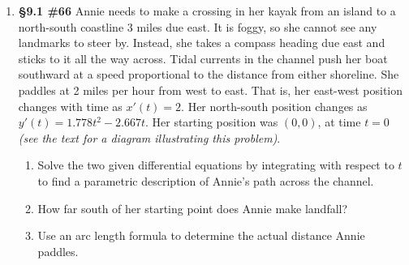 \documentclass[%
]{article}
\begin{document}
\begin{enumerate}
\item {\bf \S9.1 \#66} Annie needs to make a crossing in her kayak from an island to a north-south coastline 3 miles due east.  It is foggy, so she cannot see any landmarks to steer by.  Instead, she takes a compass heading due east and sticks to it all the way across.  Tidal currents in the channel push her boat southward at a speed proportional to the distance from either shoreline.  She paddles at 2 miles per hour from west to east.  That is, her east-west position changes with time as $x'(t)=2$.  Her north-south position changes as $y'(t)=1.778t^2-2.667t$.  Her starting position was $(0,0)$, at time $t=0$ \textit{(see the text for a diagram illustrating this problem)}.
	\begin{enumerate}
	\item Solve the two given differential equations by integrating with respect to $t$ to find a parametric description of Annie's path across the channel.
	\item How far south of her starting point does Annie make landfall?
	\item Use an arc length formula to determine the actual distance Annie paddles.
	\end{enumerate}

\end{enumerate}
\end{document}
